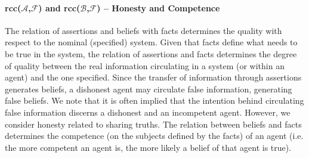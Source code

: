 \documentclass[conference]{IEEEtran}
\newcommand{\assertionRegion}{\mathcal{A}}
\newcommand{\beliefRegion}{\mathcal{B}}
\newcommand{\factRegion}{\mathcal{F}}
\newcommand{\Rcc}[2]{rcc(#1,#2)}
\begin{document}
\paragraph{\Rcc{$\assertionRegion$}{$\factRegion$} and
\Rcc{$\beliefRegion$}{$\factRegion$} -- Honesty and Competence} 
The relation of assertions
and beliefs with facts determines the quality with respect to the nominal
(specified) system.  Given that facts define what needs to be true in the system,
the relation of assertions and facts determines the degree of quality between
the real information circulating in a system (or within an agent) and
the one specified.  Since the transfer of information
through assertions generates beliefs, a dishonest agent may circulate false
information, generating false beliefs.  We note that it is often implied that
the intention behind circulating false information discerns a dishonest and an
incompetent agent. However, we consider honesty related to sharing
truths.
The relation between beliefs and
facts determines the competence (on the subjects defined by the facts) of an
agent (i.e. the more competent an agent is, the more likely a belief of that
agent is true).
\end{document}

